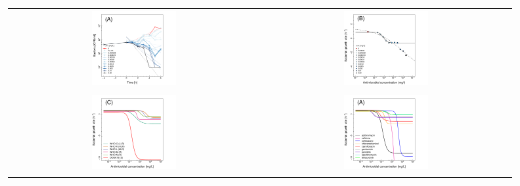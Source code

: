 \documentclass{article}
\begin{document}


\begin{center}
\centering
\begin{tabularx}{1\textwidth}{cc}

\includegraphics[trim = 0mm 0mm 0mm 0mm, clip,width=0.35\textwidth]{Figure4A}  & 
\includegraphics[trim = 0mm 0mm 0mm 0mm, clip,width=0.35\textwidth]{Figure4B}\\
\includegraphics[trim = 0mm 0mm 0mm 0mm, clip,width=0.35\textwidth]{Figure4C}&    
\includegraphics[trim = 0mm 0mm 0mm 0mm, clip,width=0.35\textwidth]{Figure4D} \\ 
\end{tabularx}
\end{center}
\flushleft
\end{document}
